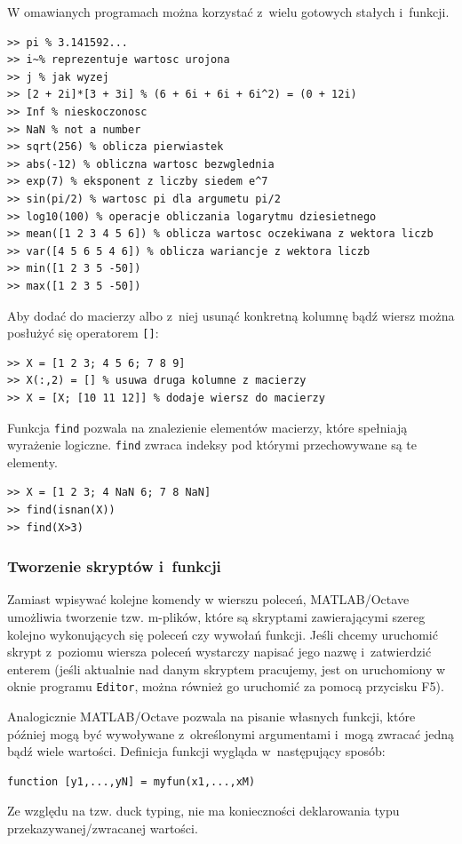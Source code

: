W omawianych programach można korzystać z~wielu gotowych stałych i~funkcji. 
\begin{lstlisting}[caption=Przykładowe stałe i funkcje , label=lab1/lst/constantsAndFucntions]
>> pi % 3.141592...
>> i~% reprezentuje wartosc urojona
>> j % jak wyzej
>> [2 + 2i]*[3 + 3i] % (6 + 6i + 6i + 6i^2) = (0 + 12i)
>> Inf % nieskoczonosc
>> NaN % not a number
>> sqrt(256) % oblicza pierwiastek
>> abs(-12) % obliczna wartosc bezwglednia
>> exp(7) % eksponent z liczby siedem e^7
>> sin(pi/2) % wartosc pi dla argumetu pi/2
>> log10(100) % operacje obliczania logarytmu dziesietnego
>> mean([1 2 3 4 5 6]) % oblicza wartosc oczekiwana z wektora liczb
>> var([4 5 6 5 4 6]) % oblicza wariancje z wektora liczb
>> min([1 2 3 5 -50])
>> max([1 2 3 5 -50])
\end{lstlisting}

Aby dodać do macierzy albo z~niej usunąć konkretną kolumnę bądź wiersz można posłużyć się operatorem \texttt{[]}:
\begin{lstlisting}[caption=Usuwanie i dodawanie wierszy/kolumn do macierzy , label=lab1/lst/matrixAddRemoveRowColumn]
>> X = [1 2 3; 4 5 6; 7 8 9]
>> X(:,2) = [] % usuwa druga kolumne z macierzy
>> X = [X; [10 11 12]] % dodaje wiersz do macierzy
\end{lstlisting}

Funkcja \texttt{find} pozwala na znalezienie elementów macierzy, które spełniają wyrażenie logiczne. \texttt{find} zwraca indeksy pod którymi przechowywane są te elementy.
\begin{lstlisting}[caption=Szukanie elementów macierzy spełniających warunek logiczny , label=lab1/lst/findFunction]
>> X = [1 2 3; 4 NaN 6; 7 8 NaN]
>> find(isnan(X))
>> find(X>3)
\end{lstlisting}

\subsubsection{Tworzenie skryptów i~funkcji}
Zamiast wpisywać kolejne komendy w wierszu poleceń, MATLAB/Octave umożliwia tworzenie tzw. m-plików, które są skryptami zawierającymi szereg kolejno wykonujących się poleceń czy wywołań funkcji. Jeśli chcemy uruchomić skrypt z~poziomu wiersza poleceń wystarczy napisać jego nazwę i~zatwierdzić enterem (jeśli aktualnie nad danym skryptem pracujemy, jest on uruchomiony w oknie programu \texttt{Editor}, można również go uruchomić za pomocą przycisku F5). 

Analogicznie MATLAB/Octave pozwala na pisanie własnych funkcji, które później mogą być wywoływane z~określonymi argumentami i~mogą zwracać jedną bądź wiele wartości. Definicja funkcji wygląda w~następujący sposób:
\begin{lstlisting}[caption=Prototyp funkcji w programie MATLAB/Octave , label=lab1/lst/matlabFunctionPrototype]
	function [y1,...,yN] = myfun(x1,...,xM)
\end{lstlisting} 
Ze względu na tzw. duck typing, nie ma konieczności deklarowania typu przekazywanej/zwracanej wartości.


